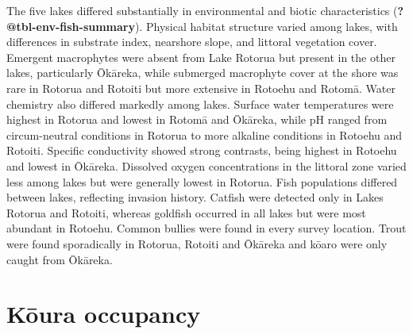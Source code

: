 \documentclass[
  12pt,
  a4paper,
]{scrbook}
\begin{document}
The five lakes differed substantially in environmental and biotic
characteristics (\textbf{?@tbl-env-fish-summary}). Physical habitat
structure varied among lakes, with differences in substrate index,
nearshore slope, and littoral vegetation cover. Emergent macrophytes
were absent from Lake Rotorua but present in the other lakes,
particularly Ōkāreka, while submerged macrophyte cover at the shore was
rare in Rotorua and Rotoiti but more extensive in Rotoehu and Rotomā.
Water chemistry also differed markedly among lakes. Surface water
temperatures were highest in Rotorua and lowest in Rotomā and Ōkāreka,
while pH ranged from circum-neutral conditions in Rotorua to more
alkaline conditions in Rotoehu and Rotoiti. Specific conductivity showed
strong contrasts, being highest in Rotoehu and lowest in Ōkāreka.
Dissolved oxygen concentrations in the littoral zone varied less among
lakes but were generally lowest in Rotorua. Fish populations differed
between lakes, reflecting invasion history. Catfish were detected only
in Lakes Rotorua and Rotoiti, whereas goldfish occurred in all lakes but
were most abundant in Rotoehu. Common bullies were found in every survey
location. Trout were found sporadically in Rotorua, Rotoiti and Ōkāreka
and kōaro were only caught from Ōkāreka.

\section{Kōura occupancy}\label{kux14dura-occupancy}
\end{document}
